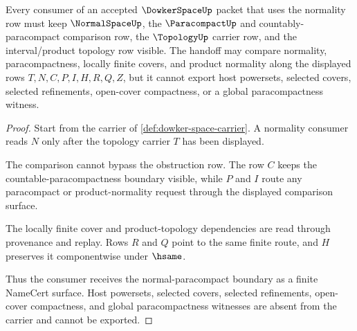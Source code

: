 \begin{theorem}
\label{thm:dowker-space-normal-paracompact-boundary}
Every consumer of an accepted $\DowkerSpaceUp$ packet that uses the normality row must keep $\NormalSpaceUp$, the $\ParacompactUp$ and countably-paracompact comparison row, the $\TopologyUp$ carrier row, and the interval/product topology row visible. The handoff may compare normality, paracompactness, locally finite covers, and product normality along the displayed rows $T,N,C,P,I,H,R,Q,Z$, but it cannot export host powersets, selected covers, selected refinements, open-cover compactness, or a global paracompactness witness.
\end{theorem}
\begin{proof}
Start from the carrier of \autoref{def:dowker-space-carrier}. A normality consumer reads $N$ only after the topology carrier $T$ has been displayed.

The comparison cannot bypass the obstruction row. The row $C$ keeps the countable-paracompactness boundary visible, while $P$ and $I$ route any paracompact or product-normality request through the displayed comparison surface.

The locally finite cover and product-topology dependencies are read through provenance and replay. Rows $R$ and $Q$ point to the same finite route, and $H$ preserves it componentwise under $\hsame$.

Thus the consumer receives the normal-paracompact boundary as a finite NameCert surface. Host powersets, selected covers, selected refinements, open-cover compactness, and global paracompactness witnesses are absent from the carrier and cannot be exported.
\end{proof}

\begin{closurestatus}{\DowkerSpaceUp}
  \theoryclosure{\seedClosure}
  \formalstatus{\unformalizedV}
\end{closurestatus}
